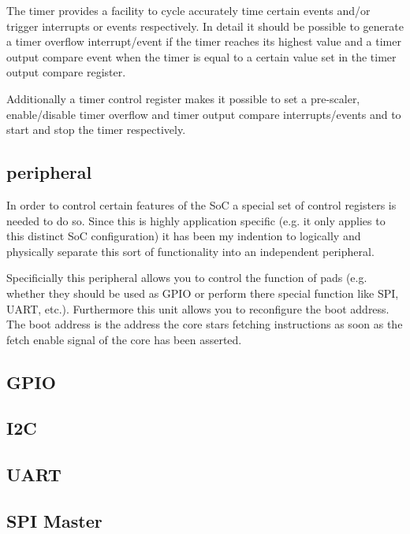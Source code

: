 The timer provides a facility to cycle accurately time certain events and/or trigger interrupts or events respectively. In detail it should be possible to generate a timer overflow interrupt/event if the timer reaches its highest value and a timer output compare event when the timer is equal to a certain value set in the timer output compare register.


Additionally a timer control register makes it possible to set a pre-scaler, enable/disable timer overflow and timer output compare interrupts/events and to start and stop the timer respectively.

\subsection{\pulpino peripheral}
\label{subsec:pulpino_peripheral}

In order to control certain features of the SoC a special set of control registers is needed to do so. Since this is highly application specific (e.g. it only applies to this distinct SoC configuration) it has been my indention to logically and physically separate this sort of functionality into an independent peripheral.

Specificially this peripheral allows you to control the function of pads (e.g. whether they should be used as GPIO or perform there special function like SPI, UART, etc.). Furthermore this unit allows you to reconfigure the boot address. The boot address is the address the core stars fetching instructions as soon as the fetch enable signal of the core has been asserted.

\subsection{GPIO}
\label{subsec:gpio_peripheral}

\subsection{I2C}

\subsection{UART}

\subsection{SPI Master}








